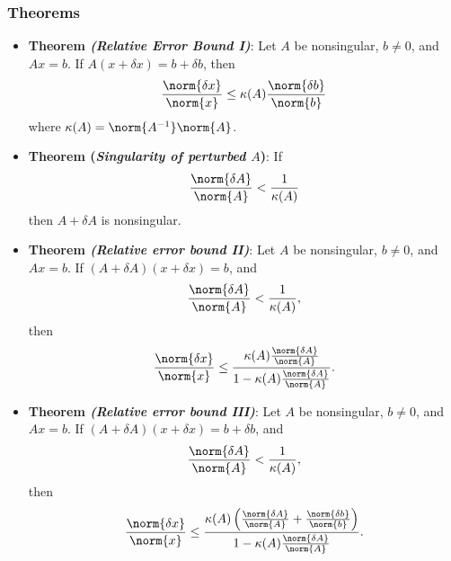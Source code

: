 \documentclass{report}
\begin{document}
    \subsubsection{Theorems}
    \begin{itemize}
        \item \textbf{Theorem \textit{(Relative Error Bound I)}}: Let $A$ be nonsingular, $b \ne 0$, and $Ax = b$. If $A(x + \delta  x) = b + \delta  b$, then
            \begin{align*}
                \frac{\norm{ \delta  x}}{\norm{ x}} \leq \kappa(A) \frac{\norm{\delta  b }}{\norm{ b}}
            \end{align*}
            where $\kappa(A) = \norm{A^{-1}}\norm{A}$.
        \item \textbf{Theorem (\textit{Singularity of perturbed $A$})}: If
            \begin{align*}
                \frac{\norm{\delta A}}{\norm{A}} < \frac{1}{\kappa(A)}
            \end{align*}
            then $A + \delta  A$ is nonsingular.
        \item \textbf{Theorem \textit{(Relative error bound II)}}: Let $A$ be nonsingular, $b\ne 0$, and $Ax=b$. If $(A + \delta A)(x + \delta x) = b$, and 
            \begin{align*}
                \frac{\norm{\delta  A}}{\norm{A}} < \frac{1}{\kappa(A)},
            \end{align*}
            then
            \begin{align*}
                \frac{\norm{\delta x}}{\norm{x}} \leq \frac{\kappa(A)\frac{\norm{\delta A}}{\norm{A}}}{1-\kappa(A)\frac{\norm{\delta A}}{\norm{A}}}
            .\end{align*}
        \item \textbf{Theorem \textit{(Relative error bound III)}}:  Let $A$ be nonsingular, $b\ne 0$, and $Ax=b$. If $(A + \delta A)(x + \delta x) = b + \delta  b$, and 
            \begin{align*}
                \frac{\norm{\delta  A}}{\norm{A}} < \frac{1}{\kappa(A)},
            \end{align*}
            then
            \begin{align*}
                \frac{\norm{\delta x}}{\norm{x}} \leq \frac{\kappa(A)\left(\frac{\norm{\delta A}}{\norm{A}} + \frac{\norm{\delta b}}{\norm{b}}\right)}{1-\kappa(A)\frac{\norm{\delta A}}{\norm{A}}}
            .\end{align*}


    \end{itemize}
\end{document}
